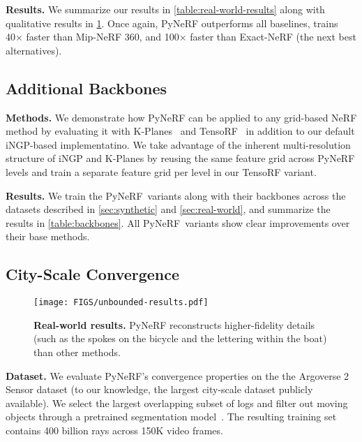 \documentclass{article}
\newcommand{\method}{PyNeRF\xspace}
\begin{document}
\textbf{Results.}
We summarize our results in \cref{table:real-world-results} along with qualitative results in \cref{fig:unbounded-results}.
Once again, \method outperforms all baselines, trains 40× faster than Mip-NeRF 360, and 100× faster than Exact-NeRF (the next best alternatives).

\subsection{Additional Backbones}
\label{sec:more-backbones}

\textbf{Methods.} We demonstrate how \method can be applied to any grid-based NeRF method by evaluating it with K-Planes~\cite{kplanes_2023} and TensoRF~\cite{Chen2022ECCV} in addition to our default iNGP-based implementatino. We take advantage of the inherent multi-resolution structure of iNGP and K-Planes by reusing the same feature grid across PyNeRF levels and train a separate feature grid per level in our TensoRF variant.

\textbf{Results.}
We train the \method\ variants along with their backbones across the datasets described in \cref{sec:synthetic} and \cref{sec:real-world}, and summarize the results in \cref{table:backbones}. All \method\ variants show clear improvements over their base methods.

\subsection{City-Scale Convergence}
\label{sec:city-scale}

\begin{figure}[t!]
\texttt{[image: FIGS/unbounded-results.pdf]}
\caption{{\bf Real-world results.} \method reconstructs higher-fidelity details (such as the spokes on the bicycle and the lettering within the boat) than other methods.}
\label{fig:unbounded-results}
\end{figure}

\textbf{Dataset.}
We evaluate \method's convergence properties on the the Argoverse 2~\cite{Argoverse2} Sensor dataset (to our knowledge, the largest city-scale dataset publicly available).
We select the largest overlapping subset of logs and filter out moving objects through a pretrained segmentation model~\cite{cheng2020panoptic}.
The resulting training set contains 400 billion rays across 150K video frames.
\end{document}
